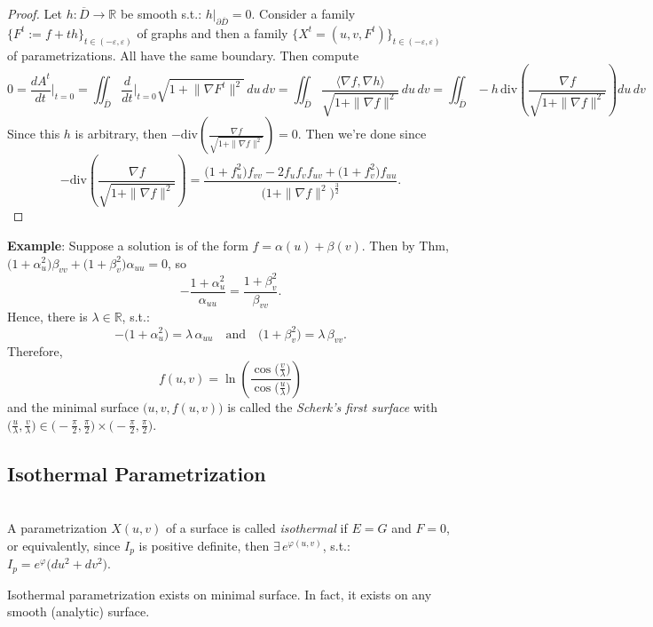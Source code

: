 \begin{proof}
Let $h: \overline{D}\to\mathbb{R}$ be smooth s.t.: $h\big|_{\partial\overline{D}} = 0$. Consider a family $\big\{F^t := f + th\big\}_{t\in(-\varepsilon, \varepsilon)}$ of graphs and then a family $\big\{X^t = (u, v, F^t)\big\}_{t\in(-\varepsilon, \varepsilon)}$ of parametrizations. All have the same boundary. Then compute
\[
0 = \frac{dA^t}{dt}\Bigg|_{t = 0} = \iint_{\overline{D}}\frac{d}{dt}\Bigg|_{t = 0}\sqrt{1 + \big\|\nabla F^t\big\|^2}\,du\,dv = \iint_{\overline{D}}\frac{\big\langle\nabla f, \nabla h\big\rangle}{\sqrt{1 + \|\nabla f\|^2}}\,du\,dv = \iint_{\overline{D}} -h\,\mathrm{div}\left(\frac{\nabla f}{\sqrt{1 + \|\nabla f\|^2}}\right)du\,dv
\]
Since this $h$ is arbitrary, then $-\mathrm{div}\left(\frac{\nabla f}{\sqrt{1 + \|\nabla f\|^2}}\right) = 0$. Then we're done since
\[
-\mathrm{div}\left(\frac{\nabla f}{\sqrt{1 + \|\nabla f\|^2}}\right) = \frac{\big(1 + f_u^2\big)f_{vv} - 2f_uf_vf_{uv} + \big(1 + f_v^2\big)f_{uu}}{\big(1 + \|\nabla f\|^2\big)^{\frac{3}{2}}}.
\]
\end{proof}

\noindent\textbf{Example}: Suppose a solution is of the form $f = \alpha(u) + \beta(v)$. Then by Thm, $\big(1 + \alpha_u^2\big)\beta_{vv} + \big(1 + \beta_v^2\big)\alpha_{uu} = 0$, so
\[
-\frac{1 + \alpha_u^2}{\alpha_{uu}} = \frac{1 + \beta_v^2}{\beta_{vv}}.
\]
Hence, there is $\lambda\in\mathbb{R}$, s.t.:
\[
-\big(1 + \alpha_u^2\big) = \lambda\,\alpha_{uu} \quad\text{and}\quad \big(1 + \beta_v^2\big) = \lambda\,\beta_{vv}.
\]
Therefore,
\[
f(u, v) = \ln\left(\frac{\cos\big(\frac{v}{\lambda}\big)}{\cos\big(\frac{u}{\lambda}\big)}\right)
\]
and the minimal surface $\big(u, v, f(u, v)\big)$ is called the \textit{Scherk's first surface} with $\big(\frac{u}{\lambda}, \frac{v}{\lambda}\big)\in\big(-\frac{\pi}{2}, \frac{\pi}{2}\big)\times\big(-\frac{\pi}{2}, \frac{\pi}{2}\big)$.

\subsection{Isothermal Parametrization}

\\
A parametrization $X(u, v)$ of a surface is called \textit{isothermal} if $E = G$ and $F = 0$, or equivalently, since $I_p$ is positive definite, then $\exists\, e^{\varphi(u, v)}$, s.t.: $I_p = e^{\varphi}\big(du^2 + dv^2\big)$.

\begin{theorem}
Isothermal parametrization exists on minimal surface. In fact, it exists on any smooth (analytic) surface.
\end{theorem}

